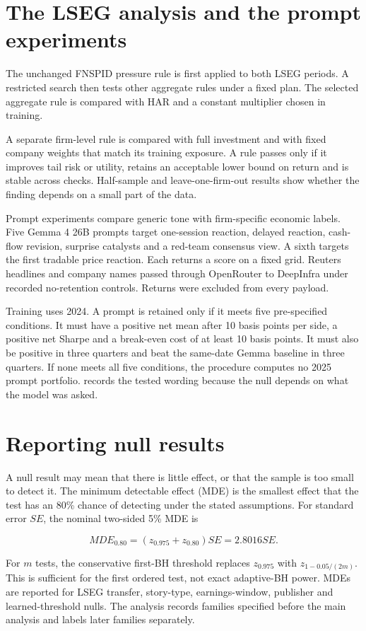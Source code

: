 \section{The LSEG analysis and the prompt experiments}

The unchanged FNSPID pressure rule is first applied to both LSEG periods. A
restricted search then tests other aggregate rules under a fixed plan. The
selected aggregate rule is compared with HAR and a constant multiplier chosen
in training.

A separate firm-level rule is compared with full investment and with fixed
company weights that match its training exposure. A rule passes only if it
improves tail risk or utility, retains an acceptable lower bound on return and
is stable across checks. Half-sample and leave-one-firm-out results show whether
the finding depends on a small part of the data.

Prompt experiments compare generic tone with firm-specific economic labels.
Five Gemma 4 26B prompts target one-session reaction, delayed reaction,
cash-flow revision, surprise catalysts and a red-team consensus view. A sixth
targets the first tradable price reaction. Each returns a score on a fixed grid.
Reuters headlines and company names passed through OpenRouter to DeepInfra under
recorded no-retention controls. Returns were excluded from every payload.

Training uses 2024. A prompt is retained only if it meets five pre-specified
conditions. It must have a positive net mean after 10 basis points per
side, a positive net Sharpe and a break-even cost of at least 10 basis points.
It must also be positive in three quarters and beat the same-date Gemma baseline
in three quarters. If none meets all five conditions, the procedure computes no
2025 prompt portfolio.
\ifdefined\withoutappendices
\else
   records the tested wording because the null depends on what
  the model was asked.
\fi

\section{Reporting null results}

A null result may mean that there is little effect, or that the sample is too
small to detect it. The minimum detectable effect (MDE) is the smallest effect
that the test has an 80\% chance of detecting under the stated assumptions. For
standard error $SE$, the nominal two-sided 5\% MDE is

\begin{equation}
 MDE_{0.80}=\left(z_{0.975}+z_{0.80}\right)SE=2.8016SE.
 \label{eq:mde}
\end{equation}

For $m$ tests, the conservative first-BH threshold replaces $z_{0.975}$ with
$z_{1-0.05/(2m)}$. This is sufficient for the first ordered test, not exact
adaptive-BH power. MDEs are reported for LSEG transfer, story-type,
earnings-window, publisher and learned-threshold nulls. The analysis records
families specified before the main analysis and labels later families separately.
